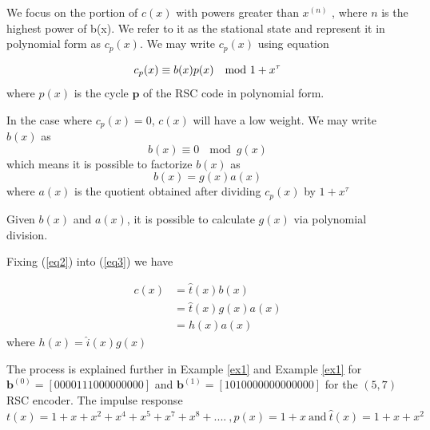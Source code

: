 \documentclass[fontsize=12pt]{article}
\begin{document}
 We focus on the portion of $c(x)$ with powers greater than $x^{(n)}$ , where $n$ is the highest power of b(x). We refer to it as the stational state and represent it in polynomial form as $c_p(x)$.  We may write $c_p(x)$ using equation 

 \begin{equation}
 c_p(x)  \equiv b(x)p(x) ~\mod{ 1+ x^{\tau}}\\
 \label{eq1}
 \end{equation}
where $p(x)$ is the cycle $\textbf{p}$ of the  RSC code in polynomial form.
 
 In the case where $c_p(x) = 0$, $c(x)$ will have a low weight.  We may write $b(x)$ as 
 $$b(x) \equiv  0 ~\mod{ g(x)} $$ which means it is possible to factorize $b(x)$ as 
 \begin{equation}
 b(x) =g(x)a(x)
 \label{eq2}
 \end{equation}
 where $a(x)$ is the quotient obtained after dividing $c_p(x)$ by $1+ x^{\tau}$
 
 Given $b(x)$ and $a(x)$, it is possible to calculate $g(x)$ via polynomial division.
 
 Fixing (\ref{eq2}) into (\ref{eq3}) we have 
 
 \begin{equation}
 \begin{split}
 c(x)&=\hat{t}(x)b(x)\\
 &=\hat{t}(x)g(x)a(x)\\
 & = h(x)a(x)
 \end{split}
 \label{eq4}
 \end{equation}
 where  $h(x)=\hat{i}(x)g(x)$ 
 
 The process is explained further in Example  \ref{ex1}  and Example  \ref{ex1} for $\textbf{b}^{(0)}=[ 0 0 0 0 1 1 1 0 0 0 0 0 0 0 0 0]$ and  $\textbf{b}^{(1)}=[ 1 0 1 0 0 0 0 0 0 0 0 0 0 0 0 0 ]$ for the $(5,7)$ RSC encoder. The impulse response $t(x)=1+x+x^2+x^4+x^5+x^7+x^8+....~,p(x)=1+x ~ \text{and} ~ \hat{t}(x)=1+x+x^2$
 
\end{document}
